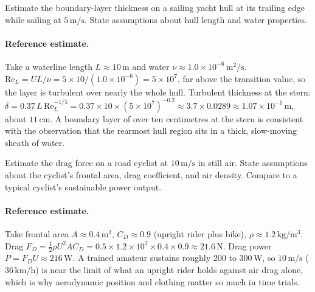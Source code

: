 \begin{exercise}
Estimate the boundary-layer thickness on a sailing yacht hull at
its trailing edge while sailing at $5\,\si{\meter\per\second}$.
State assumptions about hull length and water properties.

\paragraph{Reference estimate.} Take a waterline length $L\approx
10\,\si{\meter}$ and water $\nu\approx1.0\times10^{-6}\,\si{\meter}^2/
\si{\second}$. $\text{Re}_L = U L/\nu = 5\times10/(1.0\times10^{-6}) =
5\times10^{7}$, far above the transition value, so the layer is
turbulent over nearly the whole hull. Turbulent thickness at the
stern: $\delta = 0.37\,L\,\text{Re}_L^{-1/5} = 0.37\times10\times
(5\times10^7)^{-0.2} \approx 3.7\times0.0289 \approx 1.07\times10^{-1}
\,\si{\meter}$, about $11\,\si{\centi\meter}$. A boundary layer of
over ten centimetres at the stern is consistent with the observation
that the rearmost hull region sits in a thick, slow-moving sheath of
water.
\end{exercise}

\begin{exercise}
Estimate the drag force on a road cyclist at $10\,\si{\meter\per
\second}$ in still air. State assumptions about the cyclist's
frontal area, drag coefficient, and air density. Compare to a
typical cyclist's sustainable power output.

\paragraph{Reference estimate.} Take frontal area $A\approx0.4\,\si{
\meter}^2$, $C_D\approx0.9$ (upright rider plus bike), $\rho\approx
1.2\,\si{\kilogram\per\meter\cubed}$. Drag $F_D = \tfrac12\rho U^2 A
C_D = 0.5\times1.2\times10^2\times0.4\times0.9 \approx 21.6\,\si{
\newton}$. Drag power $P = F_D U \approx 216\,\si{\watt}$. A trained
amateur sustains roughly $200$ to $300\,\si{\watt}$, so $10\,\si{
\meter\per\second}$ ($36\,\text{km/h}$) is near the limit of what an
upright rider holds against air drag alone, which is why aerodynamic
position and clothing matter so much in time trials.
\end{exercise}

